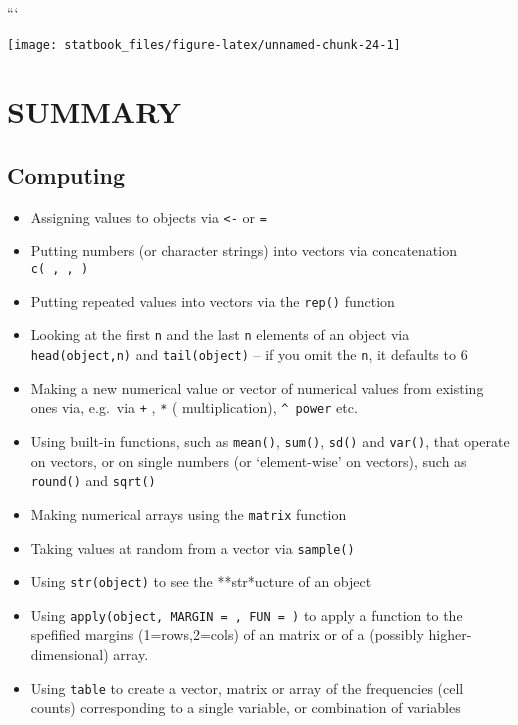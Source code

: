 \documentclass[]{book}
\begin{document}
```

\begin{center}\texttt{[image: statbook\_files/figure-latex/unnamed-chunk-24-1]} \end{center}

\hypertarget{summary-3}{%
\section{SUMMARY}\label{summary-3}}

\hypertarget{computing-1}{%
\subsection{Computing}\label{computing-1}}

\begin{itemize}
\item
  Assigning values to objects via \texttt{\textless{}-} or \texttt{=}
\item
  Putting numbers (or character strings) into vectors via concatenation \texttt{c(\ ,\ ,\ )}
\item
  Putting repeated values into vectors via the \texttt{rep()} function
\item
  Looking at the first \texttt{n} and the last \texttt{n} elements of an object via \texttt{head(object,n)} and \texttt{tail(object)} -- if you omit the \texttt{n}, it defaults to 6
\item
  Making a new numerical value or vector of numerical values from existing ones via, e.g.~via \texttt{+} , \texttt{*} ( multiplication), \texttt{\^{}\ power} etc.
\item
  Using built-in functions, such as \texttt{mean()}, \texttt{sum()}, \texttt{sd()} and \texttt{var()}, that operate on vectors, or on single numbers (or `element-wise' on vectors), such as \texttt{round()} and \texttt{sqrt()}
\item
  Making numerical arrays using the \texttt{matrix} function
\item
  Taking values at random from a vector via \texttt{sample()}
\item
  Using \texttt{str(object)} to see the **str*ucture of an object
\item
  Using \texttt{apply(object,\ MARGIN\ =\ ,\ FUN\ =\ )} to apply
  a function to the spefified margins (1=rows,2=cols) of an matrix or of a (possibly higher-dimensional) array.
\item
  Using \texttt{table} to create a vector, matrix or array of the frequencies (cell counts) corresponding to a single variable, or combination of variables

\end{itemize}
\end{document}
